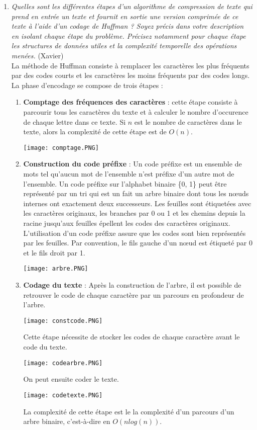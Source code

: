 \documentclass[11pt]{article}
\begin{document}
\begin{enumerate}
\item \textit{Quelles sont les différentes étapes d’un algorithme de compression de texte qui prend en entrée un texte et fournit en sortie une version comprimée de ce texte à
l'aide d'un codage de Huffman ? Soyez précis dans votre description en isolant
chaque étape du problème. Précisez notamment pour chaque étape les structures
de données utiles et la complexité temporelle des opérations menées.} (Xavier)\\
La méthode de Huffman consiste à remplacer les caractères les plus fréquents par des codes
courts et les caractères les moins fréquents par des codes longs. La phase d’encodage se compose de trois étapes :
\begin{enumerate}
\item \textbf{Comptage des fréquences des caractères} : cette étape consiste à parcourir tous les caractères du texte et à calculer le nombre d'occurence de chaque lettre dans ce texte. Si $n$ est le nombre de caractères dans le texte, alors la complexité de cette étape est de $O(n)$.
\begin{center}
    \texttt{[image: comptage.PNG]}
\end{center}
\item \textbf{Construction du code préfixe} : Un code préfixe est un ensemble de mots tel qu’aucun mot de
l’ensemble n’est préfixe d’un autre mot de l’ensemble. Un code préfixe sur l’alphabet binaire \{0, 1\} peut être représenté par
un tri qui est un fait un arbre binaire dont tous les nœuds internes ont exactement deux successeurs. Les feuilles sont étiquetées avec les caractères originaux, les branches par 0 ou 1 et les chemins depuis la racine jusqu’aux feuilles épellent les codes des caractères originaux. L’utilisation d’un code préfixe assure que les codes sont bien représentés par les feuilles. Par convention, le fils gauche d’un nœud est étiqueté par 0 et le fils droit
par 1.
\begin{center}
    \texttt{[image: arbre.PNG]}
\end{center}
\item \textbf{Codage du texte} : Après la construction de l’arbre, il est possible de retrouver le code de
chaque caractère par un parcours en profondeur de l’arbre. 
\begin{center}
    \texttt{[image: constcode.PNG]}
\end{center}
Cette étape nécessite de stocker les codes de chaque caractère avant le code du texte.
\begin{center}
    \texttt{[image: codearbre.PNG]}
\end{center}
On peut ensuite coder le texte.
\begin{center}
    \texttt{[image: codetexte.PNG]}
\end{center}
La complexité de cette étape est le la complexité d'un parcours d'un arbre binaire, c'est-à-dire en $O(n log(n))$.\\
\end{enumerate}


\end{enumerate}
\end{document}
